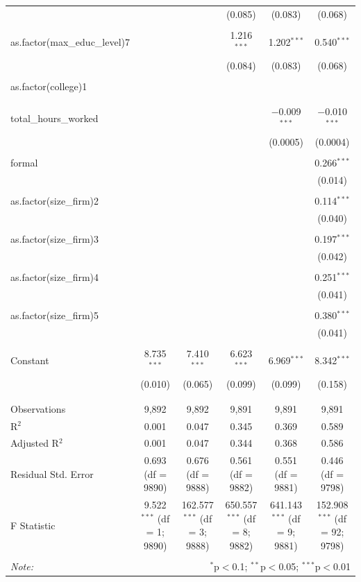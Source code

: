 \begin{table}[!htbp]
\begin{tabular}{@{\extracolsep{5pt}}lccccc}
  &  &  & (0.085) & (0.083) & (0.068) \\ 
  & & & & & \\ 
 as.factor(max\_educ\_level)7 &  &  & 1.216$^{***}$ & 1.202$^{***}$ & 0.540$^{***}$ \\ 
  &  &  & (0.084) & (0.083) & (0.068) \\ 
  & & & & & \\ 
 as.factor(college)1 &  &  &  &  &  \\ 
  &  &  &  &  &  \\ 
  & & & & & \\ 
 total\_hours\_worked &  &  &  & $-$0.009$^{***}$ & $-$0.010$^{***}$ \\ 
  &  &  &  & (0.0005) & (0.0004) \\ 
  & & & & & \\ 
 formal &  &  &  &  & 0.266$^{***}$ \\ 
  &  &  &  &  & (0.014) \\ 
  & & & & & \\ 
 as.factor(size\_firm)2 &  &  &  &  & 0.114$^{***}$ \\ 
  &  &  &  &  & (0.040) \\ 
  & & & & & \\ 
 as.factor(size\_firm)3 &  &  &  &  & 0.197$^{***}$ \\ 
  &  &  &  &  & (0.042) \\ 
  & & & & & \\ 
 as.factor(size\_firm)4 &  &  &  &  & 0.251$^{***}$ \\ 
  &  &  &  &  & (0.041) \\ 
  & & & & & \\ 
 as.factor(size\_firm)5 &  &  &  &  & 0.380$^{***}$ \\ 
  &  &  &  &  & (0.041) \\ 
  & & & & & \\ 
 Constant & 8.735$^{***}$ & 7.410$^{***}$ & 6.623$^{***}$ & 6.969$^{***}$ & 8.342$^{***}$ \\ 
  & (0.010) & (0.065) & (0.099) & (0.099) & (0.158) \\ 
  & & & & & \\ 
\hline \\[-1.8ex] 
Observations & 9,892 & 9,892 & 9,891 & 9,891 & 9,891 \\ 
R$^{2}$ & 0.001 & 0.047 & 0.345 & 0.369 & 0.589 \\ 
Adjusted R$^{2}$ & 0.001 & 0.047 & 0.344 & 0.368 & 0.586 \\ 
Residual Std. Error & 0.693 (df = 9890) & 0.676 (df = 9888) & 0.561 (df = 9882) & 0.551 (df = 9881) & 0.446 (df = 9798) \\ 
F Statistic & 9.522$^{***}$ (df = 1; 9890) & 162.577$^{***}$ (df = 3; 9888) & 650.557$^{***}$ (df = 8; 9882) & 641.143$^{***}$ (df = 9; 9881) & 152.908$^{***}$ (df = 92; 9798) \\ 
\hline 
\hline \\[-1.8ex] 
\textit{Note:}  & \multicolumn{5}{r}{$^{*}$p$<$0.1; $^{**}$p$<$0.05; $^{***}$p$<$0.01} \\ 
\end{tabular} 
\end{table} 
